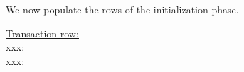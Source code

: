 
We now populate the rows of the initialization phase.
\begin{description}
	\item[\underline{\underline{Transaction row:}}]
	\item[\underline{\underline{xxx:}}]
	\item[\underline{\underline{xxx:}}]
		
\end{description}

